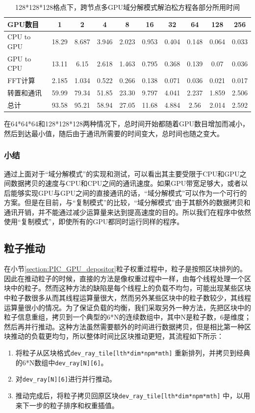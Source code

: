\begin{table}
  \centering
  \begin{tabular}{|>{\small}l|c|c|c|c|c|c|c|c|c|}
    \hline
    GPU数目	    &1	    &2	    &4	    &8 	    &16	    &32  	&64     &128	&256   \\
    \hline
    CPU to GPU	&18.29	&8.687	&3.946	&2.023	&0.953	&0.404	&0.148	&0.064	&0.033 \\
    GPU to CPU	&13.11	&6.15	&2.618	&1.463	&0.795	&0.368	&0.139	&0.07	&0.036 \\
    FFT计算  	&2.185	&1.034	&0.522	&0.266	&0.138	&0.071	&0.036	&0.021	&0.017 \\
    转置和通讯	&59.99	&79.34	&51.85	&23.30	&9.797	&4.041	&2.237	&1.859	&2.506 \\
    总计	    &93.58	&95.21	&58.94	&27.05	&11.68	&4.884	&2.56	&2.014	&2.592\\
    \hline
  \end{tabular}
  \caption{128*128*128格点下，跨节点多GPU域分解模式解泊松方程各部分所用时间}
  \label{tab:TITAN_GPU_Poisson128}
\end{table}

在64*64*64和128*128*128两种情况下，总时间开始都随着GPU数目增加而减小，然后到达最小值，随后由于通讯所需要的时间变大，总时间也随之变大。
\subsubsection{小结}
通过上面对于“域分解模式”的实现和测试，可以看出其主要受限于CPU和GPU之间数据拷贝的速度与CPU和CPU之间的通讯速度。如果GPU带宽足够大，或者以后能够实现GPU与GPU之间的直接通讯的话，“域分解模式”可以作为一个可行的方案。但是在目前，与“复制模式”的比较，“域分解模式”由于其额外的数据拷贝和通讯开销，并不能通过减少运算量来达到提高速度的目的。所以我们在程序中依然使用“复制模式”，即使所有的GPU都同时运行同样的程序。

\subsection{粒子推动}
在小节\ref{section:PIC_GPU_depositor}粒子权重过程中，粒子是按照区块排列的。因此在推动粒子的时候，直接的方法是像权重过程中一样，由每个线程处理一个区块中的粒子。然而这种方法的缺陷是每个线程上的负载不均匀，可能出现某些区块中粒子数很多从而其线程运算量很大，然而另外某些区块中的粒子数较少，其线程运算量很小的情况。为了保证负载的均衡，我们采取另外一种方法，先把区块中的粒子信息重组，拷贝到一个典型的6*N的连续数组中，其中N是粒子数，6是维度；然后再并行推动。这种方法虽然需要额外的时间进行数据拷贝，但是相比第一种区块推动的负载更均匀，所以整体时间比区块推动更短，其流程如下所示：
\begin{enumerate}
  \item 将粒子从区块格式\verb"dev_ray_tile[lth*dim*npm*mth]" 重新排列，并拷贝到经典的6*N数组中\verb"dev_ray[N][6]"。
  \item 对\verb"dev_ray[N][6]"进行并行推动。
  \item 推动完成后，将粒子拷贝回原区块\verb"dev_ray_tile[lth*dim*npm*mth]" 中，以用来下一步的粒子排序和权重插值。
\end{enumerate}


